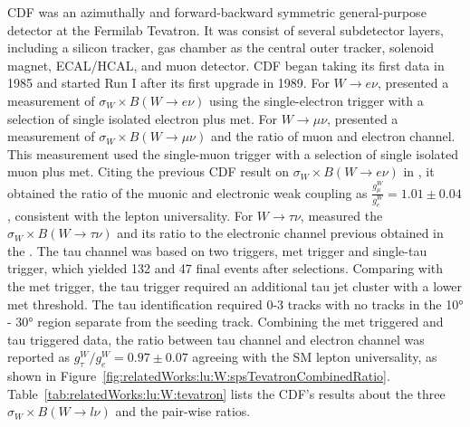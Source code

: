 CDF was an azimuthally and forward-backward symmetric general-purpose detector at the Fermilab Tevatron. It was consist of several subdetector layers, including a silicon tracker, gas chamber as the central outer tracker, solenoid magnet, ECAL/HCAL, and muon detector. CDF began taking its first data in 1985 and started Run I after its first upgrade in 1989. For $W \to e  \nu$, \cite{Abe:1990sd} presented a measurement of $\sigma_W \times B(W\to e \nu)$ using the single-electron trigger with a selection of single isolated electron plus met. For $W \to \mu  \nu$, \cite{Abe:1992ys} presented a measurement of $\sigma_W \times B(W\to \mu \nu)$ and the ratio of muon and electron channel. This measurement used the single-muon trigger with a selection of single isolated muon plus met. Citing the previous CDF result on $\sigma_W \times B(W\to e \nu)$ in \cite{Abe:1990sd}, it obtained the ratio of the muonic and electronic weak coupling as $\frac{g^W_\mu}{g^W_e}=1.01\pm0.04$, consistent with the lepton universality. For $W \to \tau \nu$, \cite{Abe:1991fb} measured the $\sigma_W \times B(W\to \tau \nu)$ and its ratio to the electronic channel previous obtained in the \cite{Abe:1990sd}. The tau channel was based on two triggers, met trigger and single-tau trigger, which yielded 132 and 47 final events after selections. Comparing with the met trigger, the tau trigger required an additional tau jet cluster with a lower met threshold. The tau identification required 0-3 tracks with no tracks in the \ang{10} - \ang{30} region separate from the seeding track. Combining the met triggered and tau triggered data, the ratio between tau channel and electron channel was reported as $g^W_\tau/g^W_e=0.97\pm0.07$  agreeing with the SM lepton universality, as shown in Figure~\ref{fig:relatedWorks:lu:W:spsTevatronCombinedRatio}. Table~\ref{tab:relatedWorks:lu:W:tevatron} lists the CDF's results about the three $\sigma_W \times B(W\to l \nu)$ and the pair-wise ratios.





